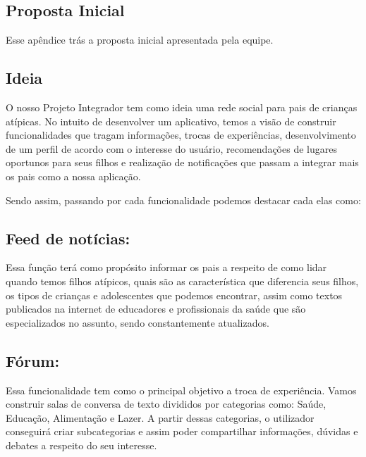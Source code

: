 \documentclass[
    12pt,               %
    openright,          %
    oneside,
    a4paper,            %
    paginasA3,  %
    BIBLATEX,           %
    REFINDENT,          %
    MODELO,             %
    TODO,               %
    english,            %
    brazil              %
    ]{ifsp-spo-inf-ctds} %
\providecommand{\DIFdelend}{} %
\begin{document}
\begin{apendicesenv}



\DIFdelend \chapter{Proposta Inicial}

Esse apêndice trás a proposta inicial apresentada pela equipe. 

\section{Ideia}

O nosso Projeto Integrador tem como ideia uma rede social para pais de crianças atípicas. No intuito de desenvolver um aplicativo, temos a visão de construir funcionalidades que tragam informações, trocas de experiências, desenvolvimento de um perfil de acordo com o interesse do usuário, recomendações de lugares oportunos para seus filhos e realização de notificações que passam a integrar mais os pais como a nossa aplicação. 

    Sendo assim, passando por cada funcionalidade podemos destacar cada elas como: 





\section{Feed de notícias:}
Essa função terá como propósito informar os pais a respeito de como lidar quando temos filhos atípicos, quais são as característica que diferencia seus filhos, os tipos de crianças e adolescentes que podemos encontrar, assim como textos publicados na internet de educadores e profissionais da saúde que são especializados no assunto, sendo constantemente atualizados. 

\section{Fórum:}
Essa funcionalidade tem como o principal objetivo a troca de experiência. Vamos construir salas de conversa de texto divididos por categorias como: Saúde, Educação, Alimentação e Lazer. A partir dessas categorias, o utilizador conseguirá criar subcategorias e assim poder compartilhar informações, dúvidas e debates a respeito do seu interesse.


\end{apendicesenv}
\end{document}
